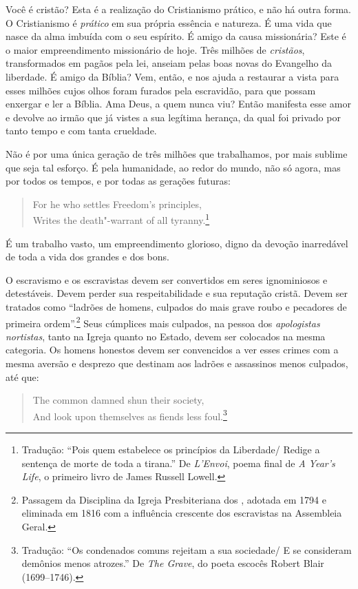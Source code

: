 Você é cristão? Esta é a realização do Cristianismo prático, e não há
outra forma. O Cristianismo é \emph{prático} em sua própria essência e
natureza. É uma vida que nasce da alma imbuída com o seu espírito. É
amigo da causa missionária? Este é o maior empreendimento missionário de
hoje. Três milhões de \emph{cristãos}, transformados em pagãos pela lei,
anseiam pelas boas novas do Evangelho da liberdade. É amigo da Bíblia?
Vem, então, e nos ajuda a restaurar a vista para esses milhões cujos
olhos foram furados pela escravidão, para que possam enxergar e ler a
Bíblia. Ama Deus, a quem nunca viu? Então manifesta esse amor e devolve
ao irmão que já vistes a sua legítima herança, da qual foi privado por
tanto tempo e com tanta crueldade.

Não é por uma única geração de três milhões que trabalhamos, por mais
sublime que seja tal esforço. É pela humanidade, ao redor do mundo, não só agora, mas por todos os tempos, e por todas as gerações futuras:

\begin{verse}
For he who settles Freedom's principles,\\
Writes the death"-warrant of all tyranny.\footnote{Tradução: ``Pois quem estabelece os princípios da Liberdade/ Redige a sentença de morte
de toda a tirana.'' De \emph{L'Envoi}, poema final de \emph{A
  Year's Life}, o primeiro livro de James Russell Lowell.}
\end{verse}

É um trabalho vasto, um empreendimento glorioso, digno da devoção
inarredável de toda a vida dos grandes e dos bons.

O escravismo e os escravistas devem ser convertidos em seres
ignominiosos e detestáveis. Devem perder sua respeitabilidade e sua
reputação cristã. Devem ser tratados como ``ladrões de homens, culpados
do mais grave roubo e pecadores de primeira ordem''.\footnote{Passagem da
  Disciplina da Igreja Presbiteriana dos , adotada em 1794 e
  eliminada em 1816 com a influência crescente dos escravistas na
  Assembleia Geral.} Seus cúmplices mais culpados, na pessoa dos
\emph{apologistas nortistas}, tanto na Igreja quanto no Estado, devem
ser colocados na mesma categoria. Os homens honestos devem ser
convencidos a ver esses crimes com a mesma aversão e desprezo que
destinam aos ladrões e assassinos menos culpados, até que:

\pagebreak

\begin{verse}
The common damned shun their society,\\
And look upon themselves as fiends less \qb{}foul.\footnote{Tradução: ``Os condenados comuns rejeitam a sua sociedade/ E se consideram demônios menos atrozes.'' De \emph{The Grave}, do poeta
  escocês Robert Blair (1699--1746).}
\end{verse}

